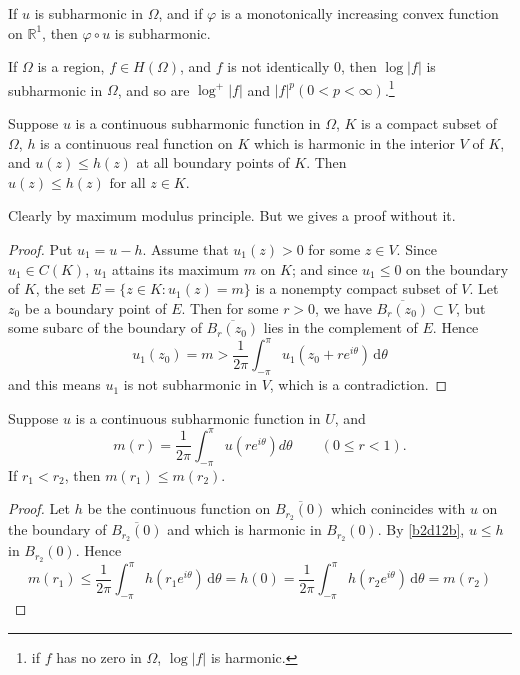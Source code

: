 \begin{theorem}[Theorem 17.2]
If $u$ is subharmonic in $\Omega$, and if $\varphi$ is a monotonically increasing convex function on $\mathbb{R}^1$, then $\varphi \circ u$ is subharmonic.
\end{theorem}
\begin{theorem}[Theorem 17.3]
If $\Omega$ is a region, $f \in H(\Omega)$, and $f$ is not identically 0, then $\log |f|$ is subharmonic in $\Omega$, and so are $\log^+ |f|$ and $|f|^p (0<p<\infty)$.\footnote{if $f$ has no zero in $\Omega$, $\log \lvert f \rvert$ is harmonic.}
\end{theorem}
\begin{theorem}[Theorem 17.4]
Suppose $u$ is a continuous subharmonic function in $\Omega$, $K$ is a compact subset of $\Omega$, $h$ is a continuous real function on $K$ which is harmonic in the interior $V$ of $K$, and $u(z) \leq h(z)$ at all boundary points of $K$. Then $u(z) \leq h(z) \text{ for all } z \in K$.\label{b2d12b}
\end{theorem}

\begin{note}
Clearly by maximum modulus principle. But we gives a proof without it.
\end{note}
\begin{proof}
Put $u_1=u-h$. Assume that $u_1(z)>0$ for some $z\in V$. Since $u_1\in C(K)$, $u_1$ attains its maximum $m$ on $K$; and since $u_1\leq0$ on the boundary of $K$, the set $E=\{ z\in K:u_1(z)=m \}$ is a nonempty compact subset of $V$. Let $z_0$ be a boundary point of $E$. Then for some $r>0$, we have $\overline{B_{r}(z_0)}\subset V$, but some subarc of the boundary of $\overline{B_{r}(z_0)}$ lies in the complement of $E$. Hence
\[
u_1(z_0)=m>\frac{1}{2\pi}\int_{-\pi}^{\pi} u_1(z_0+re^{ i\theta }) \, \mathrm{d}\theta
\]
and this means $u_1$ is not subharmonic in $V$, which is a contradiction.
\end{proof}

\begin{theorem}[Theorem 17.5]
Suppose $u$ is a continuous subharmonic function in $U$, and
\[
m(r)=\frac{1}{2 \pi} \int_{-\pi}^{\pi} u\left(r e^{i \theta}\right) d \theta \qquad (0 \leq r<1).
\]If $r_1<r_2$, then $m\left(r_1\right) \leq m\left(r_2\right)$.
\end{theorem}
\begin{proof}
Let $h$ be the continuous function on $\overline{B_{r_2}(0)}$ which conincides with $u$ on the boundary of $\overline{B_{r_2}(0)}$ and which is harmonic in $B_{r_2}(0)$. By \cref{b2d12b}, $u\leq h$ in $B_{r_2}(0)$. Hence
\[
m(r_1)\leq \frac{1}{2\pi}\int_{-\pi}^{\pi} h(r_1e^{ i\theta }) \, \mathrm{d}\theta=h(0) =\frac{1}{2\pi}\int_{-\pi}^{\pi} h(r_2e^{ i\theta }) \, \mathrm{d}\theta=m(r_2) 
\]
\end{proof}

